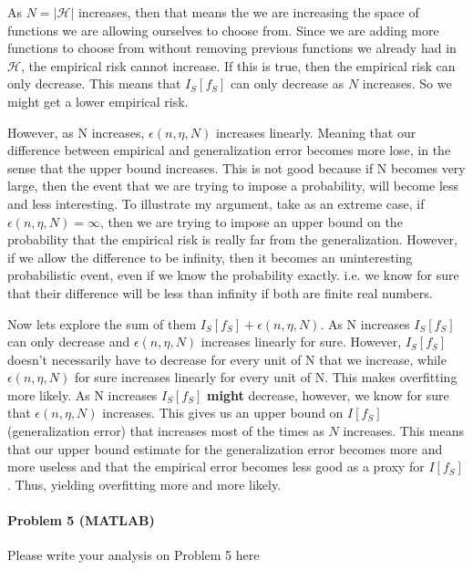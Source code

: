\documentclass[12pt]{report}
\begin{document}
As $N = |\mathcal{H}|$ increases, then that means the we are increasing the space of functions we are allowing ourselves to choose from. Since we are adding more functions to choose from without removing previous functions we already had in $\mathcal{H}$, the empirical risk cannot increase. If this is true, then the empirical risk can only decrease. This means that $I_S[f_S]$ can only decrease as $N$ increases. So we might get a lower empirical risk. 

However, as N increases, $\epsilon(n, \eta, N)$ increases linearly. Meaning that our difference between empirical and generalization error becomes more lose, in the sense that the upper bound increases. This is not good because if N becomes very large, then the event that we are trying to impose a probability, will become less and less interesting. To illustrate my argument, take as an extreme case, if $\epsilon(n, \eta, N) = \infty$, then we are trying to impose an upper bound on the probability that the empirical risk is really far from the generalization. However, if we allow the difference to be infinity, then it becomes an uninteresting probabilistic event, even if we know the probability exactly. i.e. we know for sure that their difference will be less than infinity if both are finite real numbers.

Now lets explore the sum of them $I_S[f_S] + \epsilon(n, \eta, N)$. As N increases $I_S[f_S]$ can only decrease and $\epsilon(n, \eta, N)$ increases linearly for sure. However, $I_S[f_S]$ doesn't necessarily have to decrease for every unit of N that we increase, while $\epsilon(n, \eta, N)$ for sure increases linearly for every unit of N. This makes overfitting more likely. As N increases $I_S[f_S]$ \textbf{might} decrease, however, we know for sure that $\epsilon(n, \eta, N)$ increases. This gives us an upper bound on $I[f_S]$ (generalization error) that increases most of the times as $N$ increases. This means that our upper bound estimate for the generalization error becomes more and more useless and that the empirical error becomes less good as a proxy for $I[f_S]$. Thus, yielding overfitting more and more likely.

\paragraph{Problem 5 (MATLAB)}
Please write your analysis on Problem 5 here
\end{document}
